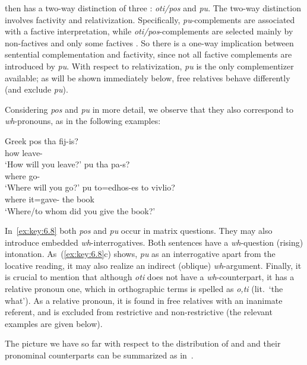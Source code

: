 \documentclass[output=paper]{langsci/langscibook}
\begin{document}
 then has a two-way distinction of three : \emph{oti/pos}
and \emph{pu}. The two-way distinction involves factivity and relativization.
Specifically, \emph{pu}{}-complements are associated with a factive
interpretation, while \emph{oti/pos}{}-comple\-ments are selected mainly by
non-factives and only some factives \parencite{Christidis1982,Roussou1994}. So
there is a one-way implication between sentential complementation and
factivity, since not all factive complements are introduced by \emph{pu}. With
respect to relativization, \emph{pu} is the only complementizer available; as
will be shown immediately below, free relatives behave differently (and exclude
\emph{pu}).

Considering \emph{pos} and \emph{pu} in more detail, we observe that they also
correspond to \emph{wh}-pronouns, as in the following examples:

\ea\label{ex:key:6.8}Greek
	\ea
		\gll pos  tha   fij-is?\\
			how \Fut{} leave-\Ssg{}\\
		\glt \enquote*{How will you leave?}
	\ex
		\gll pu  tha  pa-s?\\
			where  \Fut{} go-\Ssg{}\\
		\glt \enquote*{Where will you go?}
	\ex
		\gll pu  to=edhos-es to  vivlio?\\
			where  it=gave-\Ssg{}  the book\\
		\glt \enquote*{Where/to whom did you give the book?}
	\z
\z

In~\eqref{ex:key:6.8} both \emph{pos} and \emph{pu} occur in matrix questions. They may also
introduce embedded \emph{wh}-interrogatives. Both sentences have a \emph{wh}-question
(rising) intonation. As~(\ref{ex:key:6.8}c) shows, \emph{pu} as an interrogative apart from
the locative reading, it may also realize an indirect (oblique) \emph{wh}-argument.
Finally, it is crucial to mention that although \emph{oti} does not have a
\emph{wh}-counterpart, it has a relative pronoun one, which in orthographic terms is
spelled as \emph{o,ti} (lit.\ ‘the what’). As a relative pronoun, it is found in
free relatives with an inanimate referent, and is excluded from restrictive and
non-restrictive  (the relevant examples are given below).

The picture we have so far with respect to the distribution of  and
  and their pronominal counterparts can be
summarized as in~.
\end{document}
